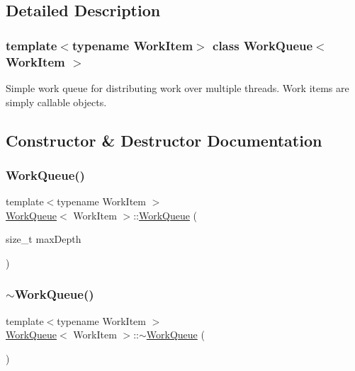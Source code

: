 \subsection{Detailed Description}
\subsubsection*{template$<$typename Work\+Item$>$\newline
class Work\+Queue$<$ Work\+Item $>$}

Simple work queue for distributing work over multiple threads. Work items are simply callable objects. 

\subsection{Constructor \& Destructor Documentation}
\mbox{\label{class_work_queue_ab67687ddb3c0358ca21d1abf0a259bcc}} 
\subsubsection{\texorpdfstring{Work\+Queue()}{WorkQueue()}}
{\footnotesize\ttfamily template$<$typename Work\+Item $>$ \\
\mbox{\hyperlink{class_work_queue}{Work\+Queue}}$<$ Work\+Item $>$\+::\mbox{\hyperlink{class_work_queue}{Work\+Queue}} (\begin{DoxyParamCaption}\item[{size\+\_\+t}]{max\+Depth }\end{DoxyParamCaption})\hspace{0.3cm}{\ttfamily [inline]}}

\mbox{\label{class_work_queue_a99827207d576d64a2d48ab26544fa99e}} 
\subsubsection{\texorpdfstring{$\sim$\+Work\+Queue()}{~WorkQueue()}}
{\footnotesize\ttfamily template$<$typename Work\+Item $>$ \\
\mbox{\hyperlink{class_work_queue}{Work\+Queue}}$<$ Work\+Item $>$\+::$\sim$\mbox{\hyperlink{class_work_queue}{Work\+Queue}} (\begin{DoxyParamCaption}{ }\end{DoxyParamCaption})\hspace{0.3cm}{\ttfamily [inline]}}



